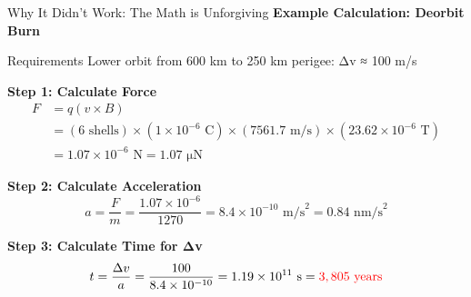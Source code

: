\documentclass[aspectratio=169]{beamer}
\begin{document}
\begin{frame}{Why It Didn't Work: The Math is Unforgiving}
\textbf{Example Calculation: Deorbit Burn}

\vspace{0.5em}
\begin{block}{Requirements}
Lower orbit from 600 km to 250 km perigee: Δv ≈ 100 m/s
\end{block}

\vspace{0.5em}
\textbf{Step 1: Calculate Force}
\begin{align*}
F &= q(v \times B) \\
  &= (6 \text{ shells}) \times (1 \times 10^{-6} \text{ C}) \times (7561.7 \text{ m/s}) \times (23.62 \times 10^{-6} \text{ T}) \\
  &= 1.07 \times 10^{-6} \text{ N} = 1.07 \text{ μN}
\end{align*}

\textbf{Step 2: Calculate Acceleration}
\begin{equation}
a = \frac{F}{m} = \frac{1.07 \times 10^{-6}}{1270} = 8.4 \times 10^{-10} \text{ m/s}^2 = 0.84 \text{ nm/s}^2
\end{equation}

\textbf{Step 3: Calculate Time for Δv}
\begin{equation}
t = \frac{\Delta v}{a} = \frac{100}{8.4 \times 10^{-10}} = 1.19 \times 10^{11} \text{ s} = \textcolor{red}{3,805 \text{ years}}
\end{equation}
\end{frame}
\end{document}
